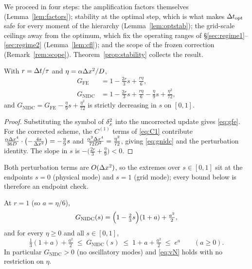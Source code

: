 We proceed in four steps: the amplification factors themselves
(Lemma~\ref{lem:factors}); stability at the optimal step, which is what
makes $\Delta t_{\mathrm{opt}}$ safe for every moment of the hierarchy
(Lemma~\ref{lem:optstab}); the grid-scale ceilings away from the optimum,
which fix the operating ranges of \S\ref{sec:regime1}--\ref{sec:regime2}
(Lemma~\ref{lem:cfl}); and the scope of the frozen correction
(Remark~\ref{rem:scope}). Theorem~\ref{prop:stability} collects the result.

\begin{lemma}\label{lem:factors}
With $r=\Delta t/\tau$ and $\eta=\alpha\Delta x^2/D$,
\begin{align}
G_{\mathrm{FE}} &= 1-\tfrac{2r}{3}s+\tfrac{r\eta}{6},\label{eq:gfe}\\
G_{\mathrm{NIDC}} &= 1-\tfrac{2r}{3}s+\tfrac{r\eta}{6}
-\tfrac{\eta}{9}s+\tfrac{\eta^2}{72},\label{eq:gnidc}
\end{align}
and $G_{\mathrm{NIDC}}=G_{\mathrm{FE}}-\frac{\eta}{9}s+\frac{\eta^2}{72}$
is strictly decreasing in $s$ on $[0,1]$.
\end{lemma}

\begin{proof}
Substituting the symbol of $\delta_x^2$ into the uncorrected update gives
\eqref{eq:gfe}. For the corrected scheme, the $C^{(1)}$ terms of
\eqref{eq:C1} contribute
$\frac{\alpha\Delta x^4}{36D}\cdot\bigl(-\frac{4s}{\Delta x^2}\bigr)=-\frac{\eta}{9}s$
and $\frac{\alpha^2\Delta x^4}{72D^2}=\frac{\eta^2}{72}$, giving \eqref{eq:gnidc}
and the perturbation identity. The slope in $s$ is
$-\bigl(\frac{2r}{3}+\frac{\eta}{9}\bigr)<0$.
\end{proof}

\noindent Both perturbation terms are $O(\Delta x^2)$, so the extremes over
$s\in[0,1]$ sit at the endpoints $s=0$ (physical mode) and $s=1$ (grid
mode); every bound below is therefore an endpoint check.

\begin{lemma}\label{lem:optstab}
At $r=1$ (so $a=\eta/6$),
\begin{equation}\label{eq:factor}
G_{\mathrm{NIDC}}(s)=\Bigl(1-\tfrac{2}{3}s\Bigr)(1+a)+\tfrac{a^2}{2},
\end{equation}
and for every $\eta\ge0$ and all $s\in[0,1]$,
\[
\tfrac13(1+a)+\tfrac{a^2}{2}\;\le\;G_{\mathrm{NIDC}}(s)\;\le\;
1+a+\tfrac{a^2}{2}\;\le\; e^{a}\qquad(a\ge0).
\]
In particular $G_{\mathrm{NIDC}}>0$ (no oscillatory modes) and
\eqref{eq:vN} holds with no restriction on $\eta$.
\end{lemma}

